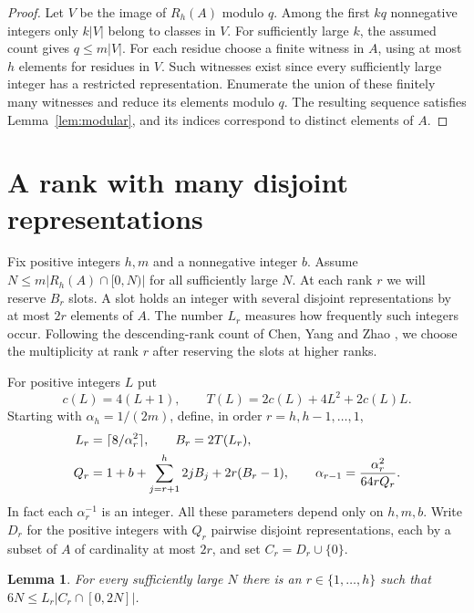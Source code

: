 \documentclass[11pt,reqno]{amsart}
\newtheorem{lemma}[theorem]{Lemma}
\theoremstyle{definition}
\theoremstyle{remark}
\begin{document}
\begin{proof}
Let \(V\) be the image of \(R_h(A)\) modulo \(q\). Among the first \(kq\)
nonnegative integers only \(k|V|\) belong to classes in \(V\).
For sufficiently large \(k\), the assumed count gives \(q\le m|V|\).
For each residue choose a finite witness in \(A\), using at most \(h\)
elements for residues in \(V\). Such witnesses exist since every
sufficiently large integer has a restricted representation. Enumerate
the union of these finitely many witnesses and reduce its elements
modulo \(q\). The resulting sequence satisfies Lemma~\ref{lem:modular},
and its indices correspond to distinct elements of \(A\).
\end{proof}

\section{A rank with many disjoint representations}\label{sec:rich}

Fix positive integers \(h,m\) and a nonnegative integer \(b\). Assume
\(N\le m|R_h(A)\cap[0,N)|\) for all sufficiently large \(N\).
At each rank \(r\) we will reserve \(B_r\) slots. A slot holds an
integer with several disjoint representations by at most \(2r\)
elements of \(A\). The number \(L_r\) measures how frequently such
integers occur. Following the descending-rank count of
Chen, Yang and Zhao \cite[Lemmas 3 and 4]{CYZ26}, we choose the
multiplicity at rank \(r\) after reserving the slots at higher ranks.

For positive integers \(L\) put
\[
 c(L)=4(L+1),\qquad T(L)=2c(L)+4L^2+2c(L)L .
\]
Starting with \(\alpha_h=1/(2m)\), define, in order \(r=h,h-1,\ldots,1\),
\begin{align}
 L_r&=\lceil 8/\alpha_r^2\rceil,\qquad B_r=2T(L_r),\notag\\
 Q_r&=1+b+\sum_{j=r+1}^{h}2jB_j+2r(B_r-1),\qquad
 \alpha_{r-1}=\frac{\alpha_r^2}{64rQ_r}.\label{eq:padded-schedule}
\end{align}
In fact each \(\alpha_r^{-1}\) is an integer. All these parameters depend
only on \(h,m,b\). Write \(D_r\) for the positive integers with \(Q_r\)
pairwise disjoint representations, each by a subset of \(A\) of
cardinality at most \(2r\), and set \(C_r=D_r\cup\{0\}\).

\begin{lemma}\label{lem:productive-rank}
For every sufficiently large \(N\) there is an \(r\in\{1,\ldots,h\}\)
such that \(6N\le L_r|C_r\cap[0,2N]|\).
\end{lemma}
\end{document}
